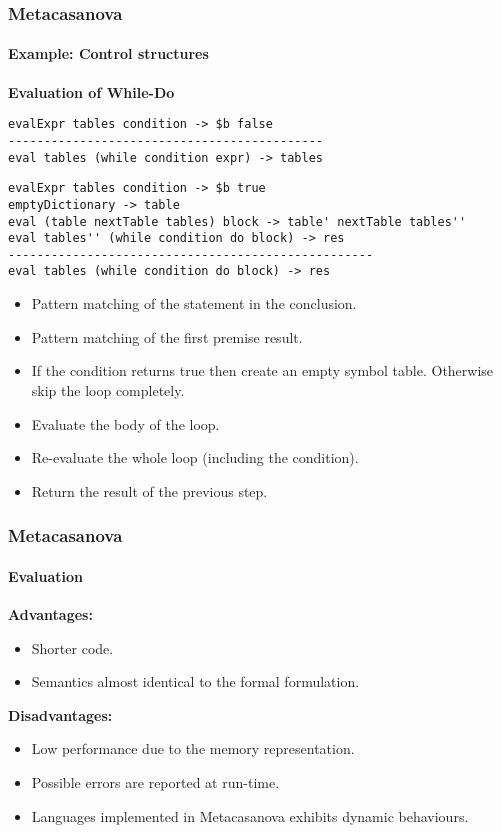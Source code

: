 \documentclass[10pt,a4paper]{beamer}
\begin{document}
\begin{frame}[fragile]
\frametitle{Metacasanova}
\framesubtitle{Example: Control structures}
\textbf{Evaluation of While-Do}
\begin{lstlisting}
evalExpr tables condition -> $b false
--------------------------------------------
eval tables (while condition expr) -> tables
\end{lstlisting}

\begin{lstlisting}
evalExpr tables condition -> $b true
emptyDictionary -> table
eval (table nextTable tables) block -> table' nextTable tables''
eval tables'' (while condition do block) -> res
---------------------------------------------------
eval tables (while condition do block) -> res
\end{lstlisting}

\begin{itemize}
	\item Pattern matching of the statement in the conclusion.
	\item Pattern matching of the first premise result.
	\item If the condition returns true then create an empty symbol table. Otherwise skip the loop completely.
	\item Evaluate the body of the loop.
	\item Re-evaluate the whole loop (including the condition).
	\item Return the result of the previous step.
\end{itemize}
\end{frame}

\begin{frame}
\frametitle{Metacasanova}
\framesubtitle{Evaluation}

\textbf{Advantages:}
\begin{itemize}
	\item Shorter code.
	\item Semantics almost identical to the formal formulation.
\end{itemize}

\textbf{Disadvantages:}
\begin{itemize}
	\item Low performance due to the memory representation.
	\item Possible errors are reported at run-time.
	\item Languages implemented in Metacasanova exhibits dynamic behaviours.
\end{itemize}
\end{frame}
\end{document}
